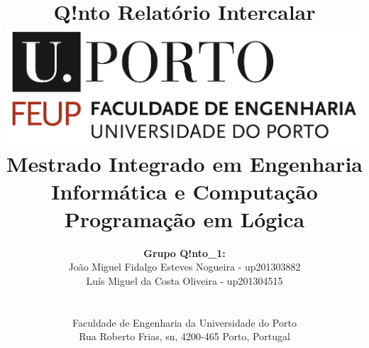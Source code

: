 \documentclass[a4paper]{article}
\begin{document}
	
	\setlength{\textwidth}{16cm}
	\setlength{\textheight}{22cm}
	
	\title{\Huge\textbf{Q!nto}\linebreak\linebreak\linebreak
	\Large\textbf{Relatório Intercalar}\linebreak\linebreak
	\linebreak\linebreak
	\includegraphics[scale=0.1]{./res/feup-logo.png}\linebreak\linebreak
	\linebreak\linebreak
	\Large{Mestrado Integrado em Engenharia Informática e Computação} \linebreak\linebreak
	\Large{Programação em Lógica}\linebreak
		}
	

	\author{
	\textbf{Grupo Q!nto\_1:}\\
	João Miguel Fidalgo Esteves Nogueira - up201303882 \\
	Luís Miguel da Costa Oliveira - up201304515 \\
	\linebreak\linebreak \\
	 \\ Faculdade de Engenharia da Universidade do Porto \\ Rua Roberto Frias, s\/n, 4200-465 Porto, Portugal \linebreak\linebreak\linebreak
	\linebreak\linebreak\vspace{1cm}}
	
	\maketitle
	\thispagestyle{empty}
	
\end{document}
